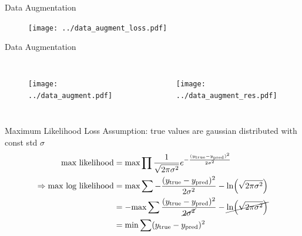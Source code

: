\documentclass[10pt]{beamer}
\begin{document}
\begin{frame}{Data Augmentation}
    \begin{figure}[htp]
      \texttt{[image: ../data\_augment\_loss.pdf]}
    \end{figure}
\end{frame}


\begin{frame}{Data Augmentation}
  \begin{columns}
    \begin{figure}[htp]
      \texttt{[image: ../data\_augment.pdf]}
    \end{figure}
    \begin{figure}[htp]
      \texttt{[image: ../data\_augment\_res.pdf]}
    \end{figure}
  \end{columns}
\end{frame}

\begin{frame}{Maximum Likelihood Loss}
Assumption: true values are gaussian distributed with const std $\sigma$
  \begin{align*}
    \text{max likelihood} &= \text{max} \prod \frac{1}{\sqrt{2\pi \sigma^2}} e^{-\frac{(y_{\text{true}}-y_{\text{pred}})^2}{2 \sigma^2}}                          \\
    \Rightarrow \text{max log likelihood} & =\text{max} \sum -\frac{(y_{\text{true}}-y_{\text{pred}})^2}{2 \sigma^2} - \ln(\sqrt{2\pi \sigma^2})                  \\
                                          & =-\text{max} \sum\frac{(y_{\text{true}}-y_{\text{pred}})^2}{\cancel{2 \sigma^2}} - \cancel{\ln(\sqrt{2\pi \sigma^2})} \\
                                          & = \text{min} \sum (y_{\text{true}}-y_{\text{pred}})^2
  \end{align*}
\end{frame}
\end{document}
